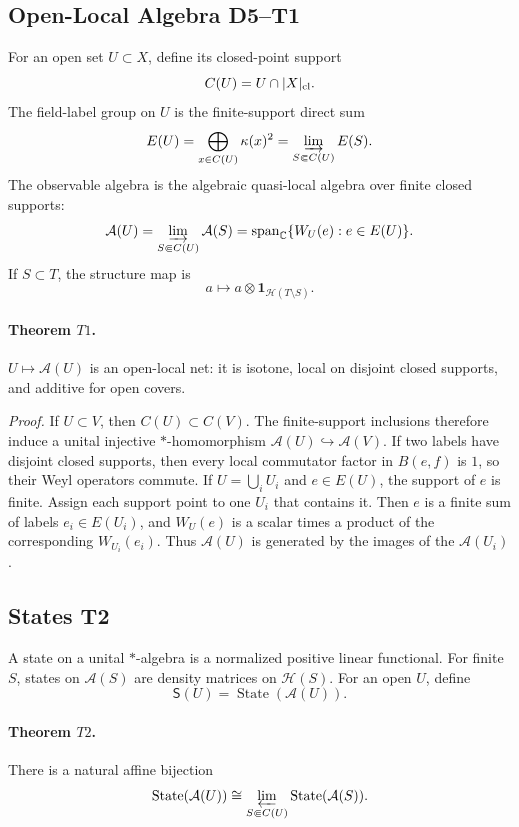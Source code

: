 \subsection{Open-Local Algebra D5--T1}

For an open set \(U\subset X\), define its closed-point support
\[
  C(U)=U\cap |X|_{\rm cl}.
\]
The field-label group on \(U\) is the finite-support direct sum
\[
  E(U)=\bigoplus_{x\in C(U)}\kappa(x)^2
      =\varinjlim_{S\Subset C(U)}E(S).
\]
The observable algebra is the algebraic quasi-local algebra over finite closed
supports:
\[
  \mathcal A(U)=
  \varinjlim_{S\Subset C(U)}\mathcal A(S)
  =
  \operatorname{span}_{\mathbb C}\{W_U(e):e\in E(U)\}.
\]
If \(S\subset T\), the structure map is
\[
  a\longmapsto a\otimes \mathbf 1_{\mathcal H(T\setminus S)}.
\]

\paragraph{Theorem \(T1\).}
\(U\mapsto\mathcal A(U)\) is an open-local net: it is isotone, local on
disjoint closed supports, and additive for open covers.

\emph{Proof.}
If \(U\subset V\), then \(C(U)\subset C(V)\).  The finite-support inclusions
therefore induce a unital injective \(*\)-homomorphism
\(\mathcal A(U)\hookrightarrow\mathcal A(V)\).  If two labels have disjoint
closed supports, then every local commutator factor in \(B(e,f)\) is \(1\), so
their Weyl operators commute.  If \(U=\bigcup_iU_i\) and \(e\in E(U)\), the
support of \(e\) is finite.  Assign each support point to one \(U_i\) that
contains it.  Then \(e\) is a finite sum of labels \(e_i\in E(U_i)\), and
\(W_U(e)\) is a scalar times a product of the corresponding \(W_{U_i}(e_i)\).
Thus \(\mathcal A(U)\) is generated by the images of the \(\mathcal A(U_i)\).

\subsection{States T2}

A state on a unital \(*\)-algebra is a normalized positive linear functional.
For finite \(S\), states on \(\mathcal A(S)\) are density matrices on
\(\mathcal H(S)\).  For an open \(U\), define
\[
  \mathsf S(U)=\operatorname{State}(\mathcal A(U)).
\]

\paragraph{Theorem \(T2\).}
There is a natural affine bijection
\[
  \operatorname{State}(\mathcal A(U))
  \cong
  \varprojlim_{S\Subset C(U)}
  \operatorname{State}(\mathcal A(S)).
\]

